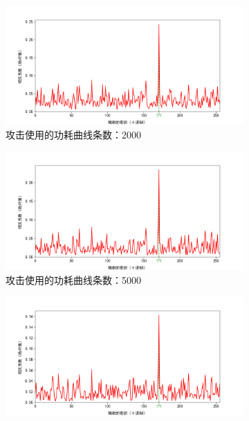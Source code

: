 \begin{figure}[htbp]
\ContinuedFloat
    \begin{subfigure}{1.0\textwidth}
        \includegraphics[height=.21\textheight, width=1.0\textwidth]{../images/keyguess_2000.png}
        \caption{攻击使用的功耗曲线条数：2000}
    \end{subfigure}
    \begin{subfigure}{1.0\textwidth}
        \includegraphics[height=.21\textheight, width=1.0\textwidth]{../images/keyguess_5000.png}
        \caption{攻击使用的功耗曲线条数：5000}
    \end{subfigure}
    \begin{subfigure}{1.0\textwidth}
        \includegraphics[height=.21\textheight, width=1.0\textwidth]{../images/keyguess_10000.png}

\end{subfigure}
\end{figure}
